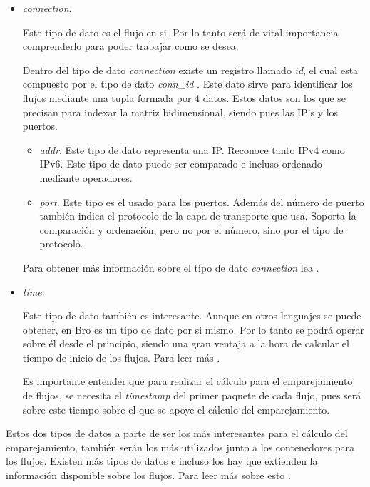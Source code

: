 \begin{itemize}

\item \textit{connection}. 

\intro Este tipo de dato es el flujo en si. Por lo tanto será de vital importancia comprenderlo para poder trabajar 
como se desea.

\intro Dentro del tipo de dato \textit{connection} existe un registro llamado \textit{id}, el cual esta 
compuesto por el tipo de dato \textit{conn\_id} \cite{broconnid}. Este dato sirve para identificar los flujos 
mediante una tupla formada por 4 datos. Estos datos son los que se precisan para indexar la matriz bidimensional, 
siendo pues las IP's y los puertos.

  \begin{itemize}

  \item \textit{addr}. Este tipo de dato representa una IP. Reconoce tanto IPv4 como IPv6. Este tipo de dato puede 
  ser comparado e incluso ordenado mediante operadores. \cite{broaddr}

  \item \textit{port}. Este tipo es el usado para los puertos. Además del número de puerto también indica el 
  protocolo de la capa de transporte que usa. Soporta la comparación y ordenación, pero no por el número, sino por 
  el tipo de protocolo. \cite{broport}
  \end{itemize}
  
\intro Para obtener más información sobre el tipo de dato \textit{connection} lea \cite{connectiontype}.

\item \textit{time}. 

\intro Este tipo de dato también es interesante. Aunque en otros lenguajes se puede obtener, 
en Bro es un tipo de dato por si mismo. Por lo tanto se podrá operar sobre él desde el principio, siendo una gran 
ventaja a la hora de calcular el tiempo de inicio de los flujos. Para leer más \cite{timetype}. 

\intro Es importante entender que para realizar el cálculo para el emparejamiento de flujos, se necesita el 
\textit{timestamp} del primer paquete de cada flujo, pues será sobre este tiempo sobre el que se apoye el 
cálculo del emparejamiento.

\end{itemize}

\intro Estos dos tipos de datos a parte de ser los más interesantes para el cálculo del emparejamiento, también 
serán los más utilizados junto a los contenedores para los flujos. Existen más tipos de datos e incluso los hay que 
extienden la información disponible sobre los flujos. Para leer más sobre esto \cite{conntype}.
